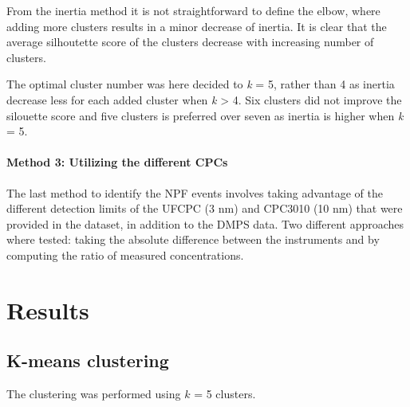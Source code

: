 \documentclass[11pt]{article}
\begin{document}
    From the inertia method it is not straightforward to define the elbow,
where adding more clusters results in a minor decrease of inertia. It is
clear that the average silhoutette score of the clusters decrease with
increasing number of clusters.

The optimal cluster number was here decided to \emph{k} = 5, rather than
4 as inertia decrease less for each added cluster when \emph{k}
\textgreater{} 4. Six clusters did not improve the silouette score and
five clusters is preferred over seven as inertia is higher when \emph{k}
= 5.

    \hypertarget{method-3-utilizing-the-different-cpcs}{%
\paragraph{Method 3: Utilizing the different
CPCs}\label{method-3-utilizing-the-different-cpcs}}

The last method to identify the NPF events involves taking advantage of
the different detection limits of the UFCPC (3 nm) and CPC3010 (10 nm)
that were provided in the dataset, in addition to the DMPS data. Two
different approaches where tested: taking the absolute difference
between the instruments and by computing the ratio of measured
concentrations.

    \hypertarget{results}{%
\section{Results}\label{results}}

    \hypertarget{k-means-clustering}{%
\subsection{K-means clustering}\label{k-means-clustering}}

    The clustering was performed using \(k\) = 5 clusters.
\end{document}
